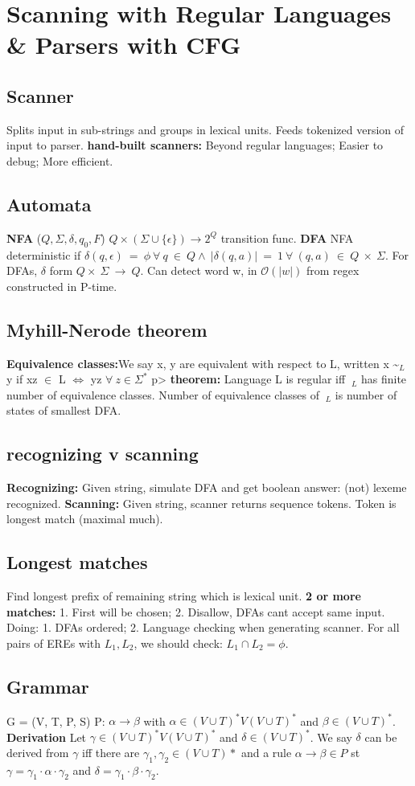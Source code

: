 \section{Scanning with Regular Languages \& Parsers with CFG}
\subsection*{Scanner}
Splits input in sub-strings and groups in lexical units. Feeds tokenized version of input to parser. \textbf{hand-built scanners:} Beyond regular languages; Easier to debug; More efficient.
\subsection*{Automata}
\textbf{NFA} ($Q,\Sigma,\delta,q_0,F$) $Q \times (\Sigma \cup \{\epsilon \}) \rightarrow 2^Q$ transition func. \textbf{DFA} NFA deterministic if $\delta (q,\epsilon )\ =\ \phi\ \forall\ q\ \in\ Q \wedge\ |\delta(q,a)|\ =\ 1\ \forall\ (q,a)\ \in\ Q\ \times\ \Sigma$. For DFAs, $\delta$ form $Q \times\ \Sigma\ \rightarrow\ Q$. Can detect word w, in $\mathcal{O}(|w|)$ from regex constructed in P-time.
\subsection*{Myhill-Nerode theorem}
\textbf{Equivalence classes:}We say x, y are equivalent with respect to L, written x \textasciitilde$_L$ y if xz $\in$ L $\iff$ yz $\forall\ z \in \Sigma^*$
p> \textbf{theorem:} Language L is regular iff $~_L$ has finite number of equivalence classes. Number of equivalence classes of $~_L$ is number of states of smallest DFA.
\subsection*{recognizing v scanning}
\textbf{Recognizing:} Given string, simulate DFA and get boolean answer: (not) lexeme recognized. \textbf{Scanning:} Given string, scanner returns sequence tokens. Token is longest match (maximal much).
\subsection*{Longest matches}
Find longest prefix of remaining string which is lexical unit. \textbf{2 or more matches:} 1. First will be chosen; 2. Disallow, DFAs cant accept same input. Doing: 1. DFAs ordered; 2. Language checking when generating scanner. For all pairs of EREs with $L_1,L_2$, we should check: $L_1 \cap L_2 = \phi$.
\subsection*{Grammar}
G = (V, T, P, S) P: $\alpha\rightarrow\beta$ with $\alpha \in (V \cup T)^*V(V\cup T)^*$ and $\beta \in (V \cup T)^*$. \textbf{Derivation} Let $\gamma \in (V \cup T)^*V(V \cup T)^*$ and $\delta \in (V \cup T)^*$. We say $\delta$ can be derived from $\gamma$ iff there are $\gamma_1,\gamma_2 \in (V \cup T)*$ and a rule $\alpha \rightarrow \beta \in P$ st $\gamma = \gamma_1 \cdot \alpha \cdot \gamma_2$ and $\delta = \gamma_1 \cdot \beta \cdot \gamma_2$.

